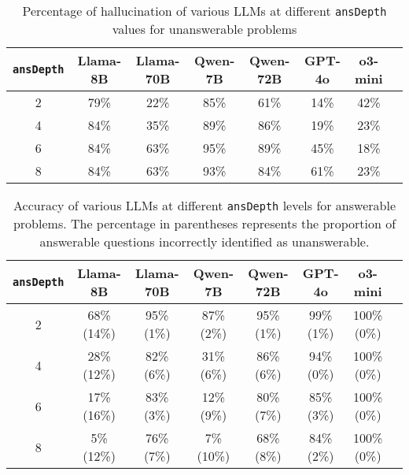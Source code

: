 \begin{table*}[t!]
    \centering
    \small
    \renewcommand{\arraystretch}{1} %
    \begin{tabular}{c|ccccccc}
        \toprule
        \texttt{ansDepth} & \textbf{Llama-8B} & \textbf{Llama-70B} & \textbf{Qwen-7B} & \textbf{Qwen-72B} & \textbf{GPT-4o} & \textbf{o3-mini} \\
        \midrule
2 & 79\% & 22\% & 85\% & 61\% & 14\% & 42\% \\
4 & 84\% & 35\% & 89\% & 86\% & 19\% & 23\% \\
6 & 84\% & 63\% & 95\% & 89\% & 45\% & 18\% \\
8 & 84\% & 63\% & 93\% & 84\% & 61\% & 23\% \\
        \bottomrule
    \end{tabular}
    \captionsetup{skip=3pt}
    \caption{\small Percentage of hallucination of various LLMs at different \texttt{ansDepth} values for unanswerable problems}
    \label{tab:unknown}
\end{table*}

\begin{table*}[h]
    \centering
    \small
    \renewcommand{\arraystretch}{1} %
    \label{tab:known}
    \begin{tabular}{c|ccccccc}
        \toprule
        \texttt{ansDepth} & \textbf{Llama-8B} & \textbf{Llama-70B} & \textbf{Qwen-7B} & \textbf{Qwen-72B} & \textbf{GPT-4o} & \textbf{o3-mini} \\
        \midrule
2 & 68\% (14\%) & 95\% (1\%) & 87\% (2\%) & 95\% (1\%) & 99\% (1\%) & 100\% (0\%) \\
4 & 28\% (12\%) & 82\% (6\%) & 31\% (6\%) & 86\% (6\%) & 94\% (0\%) & 100\% (0\%) \\
6 & 17\% (16\%) & 83\% (3\%) & 12\% (9\%) & 80\% (7\%) & 85\% (3\%) & 100\% (0\%) \\
8 & 5\% (12\%) & 76\% (7\%) & 7\% (10\%) & 68\% (8\%) & 84\% (2\%) & 100\% (0\%) \\
        \bottomrule
    \end{tabular}
    \captionsetup{skip=3pt}
    \caption{\small Accuracy of various LLMs at different \texttt{ansDepth} levels for answerable problems. The percentage in parentheses represents the proportion of answerable questions incorrectly identified as unanswerable.}
\end{table*}